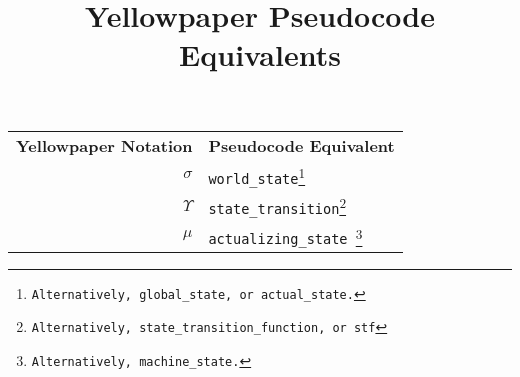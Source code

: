 \documentclass[9pt,a4paper,oneside]{scrartcl}
\author{}
\title{Yellowpaper Pseudocode Equivalents}
\date{}
\begin{document}
\maketitle

\begin{tabular}{rl}
	\textbf{Yellowpaper Notation} & \textbf{Pseudocode Equivalent} \\
	$\sigma$ & \texttt{world\_state\footnote{Alternatively, global\_state, or actual\_state.}} \\
	$\Upsilon$ & \texttt{state\_transition\footnote{Alternatively, state\_transition\_function, or stf}} \\
	$\mu$ & \texttt{actualizing\_state \footnote{Alternatively, machine\_state.}} \\
	
\end{tabular}

\printbibliography
\end{document}
